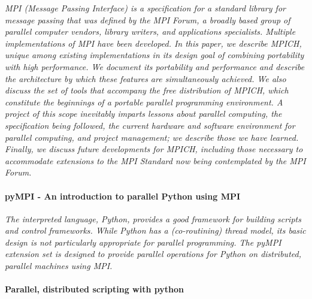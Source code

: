 \documentclass{article}
\begin{document}
{\emph{MPI (Message Passing Interface) is a specification for a standard library
for message passing that was defined by the MPI Forum, a broadly based group of
parallel computer vendors, library writers, and applications specialists.
Multiple implementations of MPI have been developed. In this paper, we describe
MPICH, unique among existing implementations in its design goal of combining
portability with high performance. We document its portability and performance
and describe the architecture by which these features are simultaneously
achieved. We also discuss the set of tools that accompany the free distribution
of MPICH, which constitute the beginnings of a portable parallel programming
environment. A project of this scope inevitably imparts lessons about parallel
computing, the specification being followed, the current hardware and software
environment for parallel computing, and project management; we describe those
we have learned.  Finally, we discuss future developments for MPICH, including
those necessary to accommodate extensions to the MPI Standard now being
contemplated by the MPI Forum.}

\paragraph{pyMPI - An introduction to parallel Python using MPI}
\cite{miller2002pympi}

\emph{The interpreted language, Python, provides a good framework for building
scripts and control frameworks. While Python has a (co-routining) thread model,
its basic design is not particularly appropriate for parallel programming. The
pyMPI extension set is designed to provide parallel operations for Python on
distributed, parallel machines using MPI.}

\paragraph{Parallel, distributed scripting with python} \cite{millerparallel}

}
\end{document}
